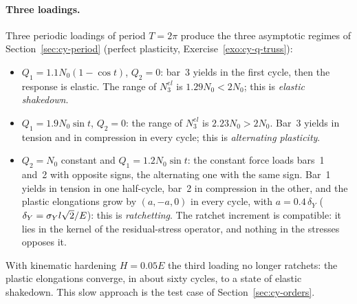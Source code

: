 \paragraph{Three loadings.}
Three periodic loadings of period $T=2\pi$ produce the three asymptotic
regimes of Section~\ref{sec:cy-period} (perfect plasticity,
Exercise~\ref{exo:cy-q-truss}):
\begin{itemize}
  \item $Q_1=1.1N_0(1-\cos t)$, $Q_2=0$: bar~3 yields in the first cycle, then
  the response is elastic. The range of $N^{el}_3$ is $1.29N_0<2N_0$; this is
  \emph{elastic shakedown}.
  \item $Q_1=1.9N_0\sin t$, $Q_2=0$: the range of $N^{el}_3$ is
  $2.23N_0>2N_0$. Bar~3 yields in tension and in compression in every cycle;
  this is \emph{alternating plasticity}.
  \item $Q_2=N_0$ constant and $Q_1=1.2N_0\sin t$: the constant force loads
  bars~1 and~2 with opposite signs, the alternating one with the same sign.
  Bar~1 yields in tension in one half-cycle, bar~2 in compression in the
  other, and the plastic elongations grow by $(a,-a,0)$ in every cycle, with
  $a=0.4\,\delta_Y$ ($\delta_Y=\sigma_{Y} l\sqrt2/E$): this is \emph{ratchetting}.
  The ratchet increment is compatible: it lies in the kernel of the
  residual-stress operator, and nothing in the stresses opposes it.
\end{itemize}
With kinematic hardening $H=0.05E$ the third loading no longer ratchets: the
plastic elongations converge, in about sixty cycles, to a state of elastic
shakedown. This slow approach is the test case of
Section~\ref{sec:cy-orders}.

